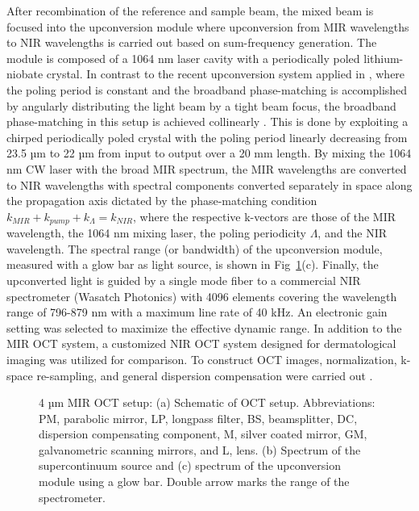 \documentclass[9pt,twocolumn]{extarticle}
\begin{document}
After recombination of the reference and sample beam, the mixed beam is focused into the upconversion module where upconversion from MIR wavelengths to NIR wavelengths is carried out based on sum-frequency generation. The module is composed of a 1064 nm laser cavity with a periodically poled lithium-niobate crystal. In contrast to the recent upconversion system applied in \cite{barh2017ultra,israelsen2019real}, where the poling period is constant and the broadband phase-matching is accomplished by angularly distributing the light beam by a tight beam focus, the broadband phase-matching in this setup is achieved collinearly \cite{friis2019upconversion}. This is done by exploiting a chirped periodically poled crystal with the poling period linearly decreasing from 23.5 µm to 22 µm from input to output over a 20 mm length. By mixing the 1064 nm CW laser with the broad MIR spectrum, the MIR wavelengths are converted to NIR wavelengths with spectral components converted separately in space along the propagation axis dictated by the phase-matching condition $k_{MIR}+k_{pump}+k_\Lambda=k_{NIR}$, where the respective k-vectors are those of the MIR wavelength, the 1064 nm mixing laser, the poling periodicity $\Lambda$, and the NIR wavelength. The spectral range (or bandwidth) of the upconversion module, measured with a glow bar as light source, is shown in Fig~\ref{Setup}(c). Finally, the upconverted light is guided by a single mode fiber to a commercial NIR spectrometer (Wasatch Photonics) with 4096 elements covering the wavelength range of 796-879 nm with a maximum line rate of 40 kHz. An electronic gain setting was selected to maximize the effective dynamic range. In addition to the MIR OCT system, a customized NIR OCT system designed for dermatological imaging \cite{israelsen2018value} was utilized for comparison. To construct OCT images, normalization, k-space re-sampling, and general dispersion compensation were carried out \cite{israelsen2018value,bradu2018recovering}.
%
\begin{figure}[htbp]
\centering
{}
\caption{4 µm MIR OCT setup: (a) Schematic of OCT setup. Abbreviations: PM, parabolic mirror, LP, longpass filter, BS, beamsplitter, DC, dispersion compensating component, M, silver coated mirror, GM, galvanometric scanning mirrors, and L, lens. (b) Spectrum of the supercontinuum source and (c) spectrum of the upconversion module using a glow bar. Double arrow marks the range of the spectrometer.}
\label{Setup}
\end{figure}
%
\end{document}
